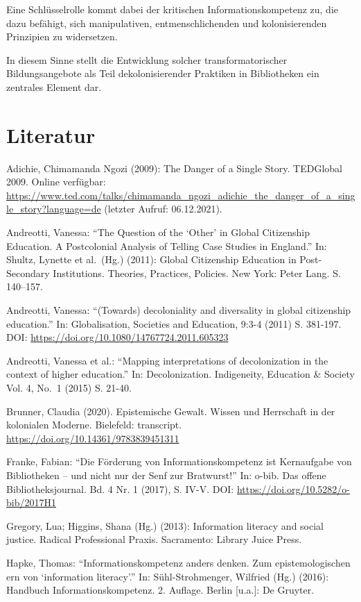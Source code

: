 \documentclass[a4paper,
fontsize=11pt,
oneside,
numbers=noperiodatend,
parskip=half-,
bibliography=totoc,
final
]{scrartcl}
\begin{document}
Eine Schlüsselrolle kommt dabei der kritischen Informationskompetenz zu,
die dazu befähigt, sich manipulativen, entmenschlichenden und
kolonisierenden Prinzipien zu widersetzen.

In diesem Sinne stellt die Entwicklung solcher transformatorischer
Bildungsangebote als Teil dekolonisierender Praktiken in Bibliotheken
ein zentrales Element dar.

\hypertarget{literatur}{%
\section{Literatur}\label{literatur}}

Adichie, Chimamanda Ngozi (2009): The Danger of a Single Story.
TEDGlobal 2009. Online verfügbar:
\url{https://www.ted.com/talks/chimamanda_ngozi_adichie_the_danger_of_a_single_story?language=de}
(letzter Aufruf: 06.12.2021).

Andreotti, Vanessa: \enquote{The Question of the \enquote*{Other} in
Global Citizenship Education. A Postcolonial Analysis of Telling Case
Studies in England.} In: Shultz, Lynette et al.~(Hg.) (2011): Global
Citizenship Education in Post-Secondary Institutions. Theories,
Practices, Policies. New York: Peter Lang. S. 140--157.

Andreotti, Vanessa: \enquote{(Towards) decoloniality and diversality in
global citizenship education.} In: Globalisation, Societies and
Education, 9:3-4 (2011) S. 381-197. DOI:
\url{https://doi.org/10.1080/14767724.2011.605323}

Andreotti, Vanessa et al.: \enquote{Mapping interpretations of
decolonization in the context of higher education.} In: Decolonization.
Indigeneity, Education \& Society Vol. 4, No.~1 (2015) S. 21-40.

Brunner, Claudia (2020). Epistemische Gewalt. Wissen und Herrschaft in
der kolonialen Moderne. Bielefeld: transcript.
\url{https://doi.org/10.14361/9783839451311}

Franke, Fabian: \enquote{Die Förderung von Informationskompetenz ist
Kernaufgabe von Bibliotheken -- und nicht nur der Senf zur Bratwurst!}
In: o-bib. Das offene Bibliotheksjournal. Bd. 4 Nr. 1 (2017), S. IV-V.
DOI: \url{https://doi.org/10.5282/o-bib/2017H1}

Gregory, Lua; Higgins, Shana (Hg.) (2013): Information literacy and
social justice. Radical Professional Praxis. Sacramento: Library Juice
Press.

Hapke, Thomas: \enquote{Informationskompetenz anders denken. Zum
epistemologischen ern von \enquote*{information literacy}.} In:
Sühl-Strohmenger, Wilfried (Hg.) (2016): Handbuch Informationskompetenz.
2. Auflage. Berlin {[}u.a.{]}: De Gruyter.
\end{document}
